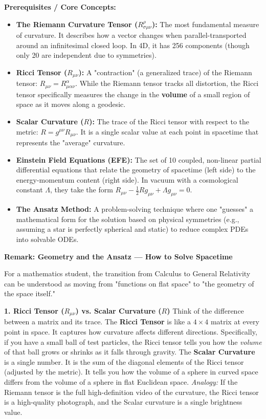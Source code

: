 \begin{solution}
\textbf{Prerequisites / Core Concepts:}
\begin{itemize}
    \item \textbf{The Riemann Curvature Tensor ($R^\rho_{\sigma\mu\nu}$):} The most fundamental measure of curvature. It describes how a vector changes when parallel-transported around an infinitesimal closed loop. In 4D, it has 256 components (though only 20 are independent due to symmetries).
    \item \textbf{Ricci Tensor ($R_{\mu\nu}$):} A "contraction" (a generalized trace) of the Riemann tensor: $R_{\mu\nu} = R^\alpha_{\mu\alpha\nu}$. While the Riemann tensor tracks all distortion, the Ricci tensor specifically measures the change in the \textbf{volume} of a small region of space as it moves along a geodesic.
    \item \textbf{Scalar Curvature ($R$):} The trace of the Ricci tensor with respect to the metric: $R = g^{\mu\nu} R_{\mu\nu}$. It is a single scalar value at each point in spacetime that represents the "average" curvature.
    \item \textbf{Einstein Field Equations (EFE):} The set of 10 coupled, non-linear partial differential equations that relate the geometry of spacetime (left side) to the energy-momentum content (right side). In vacuum with a cosmological constant $\Lambda$, they take the form $R_{\mu\nu} - \frac{1}{2} R g_{\mu\nu} + \Lambda g_{\mu\nu} = 0$.
    \item \textbf{The Ansatz Method:} A problem-solving technique where one "guesses" a mathematical form for the solution based on physical symmetries (e.g., assuming a star is perfectly spherical and static) to reduce complex PDEs into solvable ODEs.
\end{itemize}

\textbf{Remark: Geometry and the Ansatz --- How to Solve Spacetime}

For a mathematics student, the transition from Calculus to General Relativity can be understood as moving from "functions on flat space" to "the geometry of the space itself."

\textbf{1. Ricci Tensor ($R_{\mu\nu}$) vs. Scalar Curvature ($R$)}
Think of the difference between a matrix and its trace. 
The \textbf{Ricci Tensor} is like a $4 \times 4$ matrix at every point in space. It captures how curvature affects different directions. Specifically, if you have a small ball of test particles, the Ricci tensor tells you how the \textit{volume} of that ball grows or shrinks as it falls through gravity.
The \textbf{Scalar Curvature} is a single number. It is the sum of the diagonal elements of the Ricci tensor (adjusted by the metric). It tells you how the volume of a sphere in curved space differs from the volume of a sphere in flat Euclidean space. 
\textit{Analogy:} If the Riemann tensor is the full high-definition video of the curvature, the Ricci tensor is a high-quality photograph, and the Scalar curvature is a single brightness value.


\end{solution}

